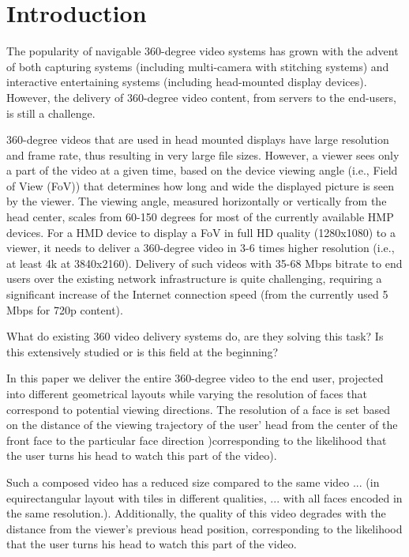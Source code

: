 \section{Introduction}

The popularity of navigable 360-degree video systems has grown with the advent of both capturing systems (including multi-camera with stitching systems) and interactive entertaining systems (including head-mounted display devices). However, the delivery of 360-degree video content, from servers to the end-users, is still a challenge.

360-degree videos that are used in head mounted displays have large resolution and frame rate, thus resulting in very large file sizes. However, a viewer sees only a part of the video at a given time, based on the device viewing angle (i.e., Field of View (FoV)) that determines how long and wide the displayed picture is seen by the viewer. The viewing angle, measured horizontally or vertically from the head center, scales from 60-150 degrees for most of the currently available HMP devices. For a HMD device to display a FoV in full HD quality (1280x1080) to a viewer, it needs to deliver a 360-degree video in 3-6 times higher resolution (i.e., at least 4k at 3840x2160). Delivery of such videos with 35-68 Mbps bitrate to end users over the existing network infrastructure is quite challenging, requiring a significant increase of the Internet connection speed (from the currently used 5 Mbps for 720p content).

What do existing 360 video delivery systems do, are they solving this task? Is this extensively studied or is this field at the beginning?

In this paper we deliver the entire 360-degree video to the end user, projected into different geometrical layouts while varying the resolution of faces that correspond to potential viewing directions. The resolution of a face is set based on the distance of the viewing trajectory of the user' head from the center of the front face to the particular face direction )corresponding to the likelihood that the user turns his head to watch this part of the video).

Such a composed video has a reduced size compared to the same video ... (in equirectangular layout with tiles in different qualities, ... with all faces encoded in the same resolution.). Additionally, the quality of this video degrades with the distance from the viewer's previous head position, corresponding to the likelihood that the user turns his head to watch this part of the video.

